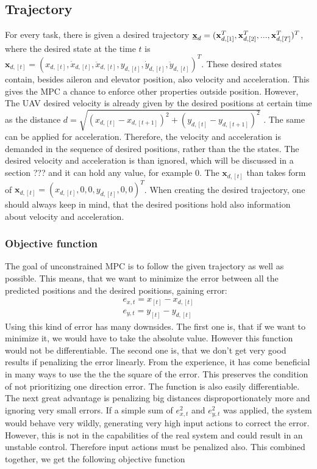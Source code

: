 \documentclass{article}
\begin{document}
\subsection{Trajectory}
For every task, there is given a desired trajectory $\textbf{\underline{x}}_d = 
(\textbf{x}_{d,[1]}^T, \textbf{x}_{d,[2]}^T, ..., \textbf{x}_{d,[T]}^T)^T$, where the desired state at the time $t$ is $\textbf{x}_{d,[t]} = (x_{d,[t]}, \dot{x}_{d,[t]}, \ddot{x}_{d,[t]}, y_{d,[t]}, \dot{y}_{d,[t]}, \ddot{y}_{d,[t]})^T$. These desired states contain, besides aileron and elevator position, also velocity and acceleration. This gives the MPC a chance to  enforce other properties outside position. However, The UAV desired velocity is already given by the desired positions at certain time as the distance $d = \sqrt{(x_{d,[t]}-x_{d,[t+1]})^2+ (y_{d,[t]}- y_{d,[t+1]})^2}$ . The same can be applied for acceleration. Therefore, the velocity and acceleration is demanded in the sequence of desired positions, rather than the the states. The desired velocity and acceleration is than ignored, which will be discussed in a section ??? and it can hold any value, for example 0. The $\textbf{x}_{d,[t]}$ than takes form of $\textbf{x}_{d,[t]} = (x_{d,[t]}, 0, 0, y_{d,[t]}, 0, 0)^T$. When creating the desired trajectory, one should always keep in mind, that the desired positions hold also information about velocity and acceleration. 

\subsubsection{Objective function}
The goal of unconstrained MPC is to follow the given trajectory as well as possible. This means, that we want to minimize the error between all the predicted positions and the desired positions, gaining error:
\begin{equation}
\begin{split}
\label{eq:simple_err}
e_{x, t} = x_{[t]} - x_{d, [t]}\\
e_{y, t} = y_{[t]} - y_{d, [t]}
\end{split}
\end{equation}
Using this kind of error has many downsides. The first one is, that if we want to minimize it, we would have to take the absolute value. However this function would not be differentiable. The second one is, that we don't get very good  results if penalizing the error linearly. From the experience, it has come beneficial in many ways to use the the the square of the error. This preserves the condition of not prioritizing one direction error. The function is also easily differentiable. The next great advantage is penalizing big distances disproportionately more and ignoring very small errors. 
If a simple sum of $e_{x, t}^2$ and $e_{y, t}^2$ was applied, the system would behave very wildly, generating very high input actions to correct the error. However, this is not in the capabilities of the real system and could result in an unstable control. Therefore input actions must be penalized also. This combined together, we get the following objective function 
\end{document}
